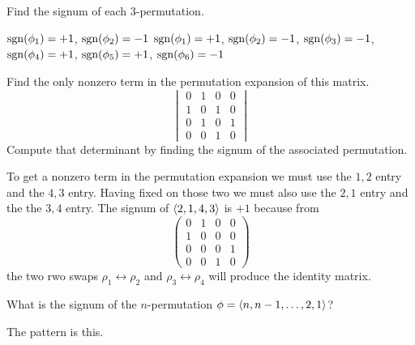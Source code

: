 \begin{exercises}
\begin{exparts}
      \partsitem Find the signum of each $3$-permutation.
    \end{exparts}
    \begin{answer}
      \begin{exparts}
        \partsitem \( \operatorname{sgn}(\phi_1)=+1 \), \( \operatorname{sgn}(\phi_2)=-1 \)
        \partsitem \( \operatorname{sgn}(\phi_1)=+1 \), \( \operatorname{sgn}(\phi_2)=-1 \),
              \( \operatorname{sgn}(\phi_3)=-1 \), \( \operatorname{sgn}(\phi_4)=+1 \),
              \( \operatorname{sgn}(\phi_5)=+1 \), \( \operatorname{sgn}(\phi_6)=-1 \)
      \end{exparts}  
     \end{answer}
  \item 
    Find the only nonzero term in the permutation expansion of
    this matrix.
    \begin{equation*}
      \begin{vmatrix}
        0  &1  &0  &0  \\
        1  &0  &1  &0  \\
        0  &1  &0  &1  \\
        0  &0  &1  &0
      \end{vmatrix}
    \end{equation*}
    Compute that determinant by finding the signum of the associated
    permutation.
    \begin{answer}
      To get a nonzero term in the permutation expansion we must use
      the \( 1,2 \) entry and the \( 4,3 \) entry.
      Having fixed on those two we must also use the \( 2,1 \) entry and
      the the \( 3,4 \) entry.
      The signum of \( \langle2,1,4,3\rangle \) is \( +1 \) because from
      \begin{equation*}
        \begin{pmatrix}
          0  &1  &0  &0  \\
          1  &0  &0  &0  \\
          0  &0  &0  &1  \\
          0  &0  &1  &0            
        \end{pmatrix}
      \end{equation*}
      the two rwo swaps $\rho_1\leftrightarrow\rho_2$ and 
      $\rho_3\leftrightarrow\rho_4$ will produce the identity matrix.  
    \end{answer}
  \item  
    What is the signum of the $n$-permutation
    \( \phi=\langle n,n-1,\dots,2,1\rangle \)?
    \cite{Strang}
    \begin{answer}
      The pattern is this.
      \begin{center}

\end{center}
\end{answer}
\end{exercises}
